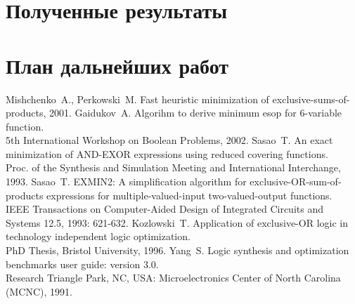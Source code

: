 \documentclass[a4paper,12pt,titlepage,finall]{article}
\begin{document}
\section{Полученные результаты}


\section{План дальнейших работ}


\begin{raggedright}
\begin{thebibliography}{99}
     Mishchenko~A., Perkowski~M. Fast heuristic minimization of exclusive-sums-of-products, 2001.
     Gaidukov~A. Algorihm to derive minimum esop for 6-variable function.\\5th International Workshop on Boolean Problems, 2002.
     Sasao~T. An exact minimization of AND-EXOR expressions using reduced covering functions.\\Proc. of the Synthesis and Simulation Meeting and International Interchange, 1993.
     Sasao~T. EXMIN2: A simplification algorithm for exclusive-OR-sum-of-products expressions for multiple-valued-input two-valued-output functions.\\IEEE Transactions on Computer-Aided Design of Integrated Circuits and Systems 12.5, 1993: 621-632.
     Kozlowski~T. Application of exclusive-OR logic in technology independent logic optimization.\\PhD Thesis, Bristol University, 1996.
     Yang~S. Logic synthesis and optimization benchmarks user guide: version 3.0.\\Research Triangle Park, NC, USA: Microelectronics Center of North Carolina (MCNC), 1991.
\end{thebibliography}
\end{raggedright}
\end{document}
